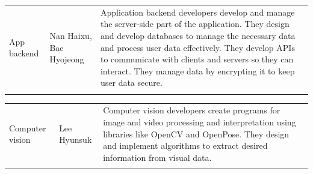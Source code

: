 \documentclass[11pt, conference]{IEEEtran}
\begin{document}
\begin{enumerate}[label=\arabic*]
    \begin{table}[H]
    \center
    \begin{tabular}{m{1.4cm} m{1.5cm} m{4cm}}
    App backend & Nan Haixu, Bae Hyojeong & Application backend developers develop and manage the server-side part of the application. They design and develop databases to manage the necessary data and process user data effectively. They develop APIs to communicate with clients and servers so they can interact. They manage data by encrypting it to keep user data secure. \\\\
    \bottomrule
    \end{tabular}
    \end{table}

    \begin{table}[H]
    \center
    \begin{tabular}{m{1.4cm} m{1.5cm} m{4cm}}
    Computer vision & Lee Hyunsuk & Computer vision developers create programs for image and video processing and interpretation using libraries like OpenCV and OpenPose. They design and implement algorithms to extract desired information from visual data. \\\\
    \bottomrule
    \end{tabular}
    \end{table}
    
\end{enumerate}
\end{document}
